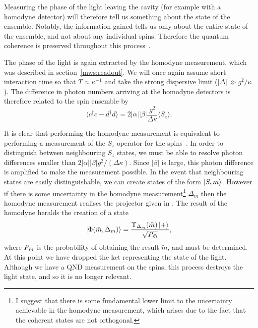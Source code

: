 Measuring the phase of the light leaving the cavity (for example with a
homodyne detector) will therefore tell us something about the state of the
ensemble. Notably, the information gained tells us only about the entire state
of the ensemble, and not about any individual spins. Therefore the quantum
coherence is preserved throughout this process~\cite{PhysRevA.83.013821,
Vanner16182, Bao2020}.

The phase of the light is again extracted by the homodyne measurement, which
was described in section~\ref{mws:readout}. We will once again assume short
interaction time so that $T\approx\kappa^{-1}$ and take the strong dispersive
limit ($|\Delta| \gg g^2/\kappa$). The difference in photon numbers arriving at
the homodyne detectors is therefore related to the spin ensemble by
%
\begin{equation}
  \langle c^\dagger c - d^\dagger d\rangle = 2|\alpha||\beta|
  \frac{g^2}{\Delta\kappa}\langle S_z\rangle.
  \label{squeeze:eqn:homomeas}
\end{equation}

It is clear that performing the homodyne measurement is equivalent to
performing a measurement of the $S_z$ operator for the spins~\cite{Bao2020}. In
order to distinguish between neighbouring $S_z$ states, we must be able to
resolve photon differences smaller than $2|\alpha||\beta|g^2/(\Delta\kappa)$.
Since $|\beta|$ is large, this photon difference is amplified to make the
measurement possible. In the event that neighbouring states are easily
distinguishable, we can create states of the form $\ket{S,m}$. However if there
is some uncertainty in the homodyne measurement\footnote{I suggest that there
is some fundamental lower limit to the uncertainty achievable in the homodyne
measurement, which arises due to the fact that the coherent states are not
orthogonal.} $\Delta_m$ then the homodyne measurement realises the projector
given in . 
%
The result of the homodyne heralds the creation of a state
%
\begin{equation}
  \ket{\Phi(\tilde{m}, \Delta_m)} = \frac{\Upsilon_{\Delta_m}
  (\tilde{m})\ket{+}}{ \sqrt{P_{\tilde{m}}} },
\end{equation}
%
where $P_{\tilde{m}}$ is the probability of obtaining the result $\tilde{m}$, and
must be determined.
%
At this point we have dropped the ket representing the state of the light.
Although we have a QND measurement on the spins, this process destroys the
light state, and so it is no longer relevant.

